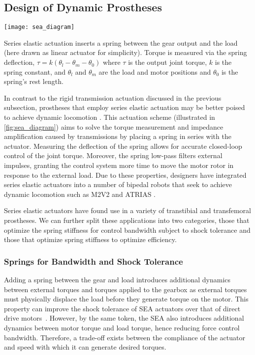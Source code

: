 

\subsection{Design of Dynamic Prostheses}\label{sec:back_dyn_pros}
\begin{marginfigure}[2.5in]
    \centering
    \texttt{[image: sea\_diagram]}
    \caption{Series elastic actuation inserts a spring between the gear output
    and the load (here drawn as linear actuator for simplicity). Torque is
    measured via the spring deflection, $\tau = k(\theta_l - \theta_m -
    \theta_0)$ where $\tau$ is the output joint torque, $k$ is the spring
    constant, and $\theta_l$ and $\theta_m$ are the load and motor positions and
    $\theta_0$ is the spring's rest length.}
    \label{fig:sea_diagram}
\end{marginfigure}
In contrast to the rigid transmission actuation discussed in the previous
subsection, prostheses that employ series elastic actuation may be better poised
to achieve dynamic locomotion \citep{pratt1995series}. This actuation scheme
(illustrated in \cref{fig:sea_diagram}) aims to solve the torque measurement and
impedance amplification caused by transmissions by placing a spring in series
with the actuator. Measuring the deflection of the spring allows for accurate
closed-loop control of the joint torque. Moreover, the spring low-pass filters
external impulses, granting the control system more time to move the motor rotor
in response to the external load.  Due to these properties, designers have
integrated series elastic actuators into a number of bipedal robots that seek to
achieve dynamic locomotion such as M2V2 \citep{pratt2008design} and ATRIAS
\citep{grimes2013atrias}.

Series elastic actuators have found use in a variety of transtibial and
transfemoral prostheses. We can further split these applications into two
categories, those that optimize the spring stiffness for control bandwidth
subject to shock tolerance and those that optimize spring stiffness to optimize
efficiency.

\subsubsection{Springs for Bandwidth and Shock Tolerance}
Adding a spring between the gear and load introduces additional dynamics between
external torques and torques applied to the gearbox as external torques must
physically displace the load before they generate torque on the motor. This
property can improve the shock tolerance of SEA actuators over that of direct
drive motors~\citep{robinson2000design}. However, by the same token, the SEA
also introduces additional dynamics between motor torque and load torque, hence
reducing force control bandwidth. Therefore, a trade-off exists between the
compliance of the actuator and speed with which it can generate desired torques.

